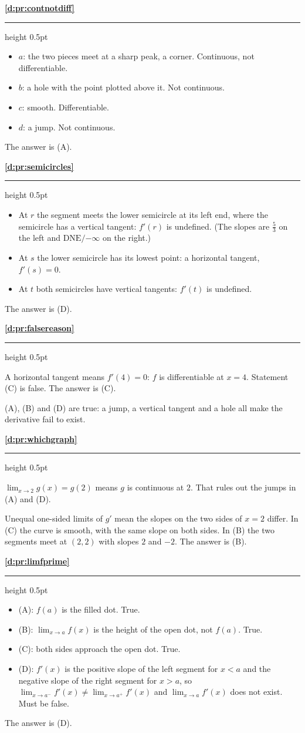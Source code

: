 \documentclass[11pt,a4paper]{article}
\newcommand{\solitem}[2]{%
 \par\addvspace{16pt}\Needspace{10\baselineskip}%
 {\large\bfseries \ref{#1}}\par\nobreak\vspace{2pt}%
 {\color{rulegray}\hrule height 0.5pt}\nobreak\vspace{7pt}%
 #2\par}
\newcommand{\DNEninf}{\ensuremath{\text{DNE}/{-\infty}}}
\begin{document}
\solitem{d:pr:contnotdiff}{%
\begin{itemize}
 \item $a$: the two pieces meet at a sharp peak, a corner. Continuous, not differentiable.
 \item $b$: a hole with the point plotted above it. Not continuous.
 \item $c$: smooth. Differentiable.
 \item $d$: a jump. Not continuous.
\end{itemize}
The answer is (A).
}

\solitem{d:pr:semicircles}{%
\begin{itemize}
 \item At $r$ the segment meets the lower semicircle at its left end, where the semicircle has a vertical tangent: $f'(r)$ is undefined. (The slopes are $\frac53$ on the left and $\DNEninf$ on the right.)
 \item At $s$ the lower semicircle has its lowest point: a horizontal tangent, $f'(s)=0$.
 \item At $t$ both semicircles have vertical tangents: $f'(t)$ is undefined.
\end{itemize}
The answer is (D).
}

\solitem{d:pr:falsereason}{%
A horizontal tangent means $f'(4)=0$: $f$ is differentiable at $x=4$. Statement (C) is false. The answer is (C).

(A), (B) and (D) are true: a jump, a vertical tangent and a hole all make the derivative fail to exist.
}

\solitem{d:pr:whichgraph}{%
$\displaystyle\lim_{x\to2}g(x)=g(2)$ means $g$ is continuous at $2$. That rules out the jumps in (A) and (D).

Unequal one-sided limits of $g'$ mean the slopes on the two sides of $x=2$ differ. In (C) the curve is smooth, with the same slope on both sides. In (B) the two segments meet at $(2,2)$ with slopes $2$ and $-2$. The answer is (B).
}

\solitem{d:pr:limfprime}{%
\begin{itemize}
 \item (A): $f(a)$ is the filled dot. True.
 \item (B): $\displaystyle\lim_{x\to a}f(x)$ is the height of the open dot, not $f(a)$. True.
 \item (C): both sides approach the open dot. True.
 \item (D): $f'(x)$ is the positive slope of the left segment for $x<a$ and the negative slope of the right segment for $x>a$, so $\displaystyle\lim_{x\to a^-}f'(x)\ne\lim_{x\to a^+}f'(x)$ and $\displaystyle\lim_{x\to a}f'(x)$ does not exist. Must be false.
\end{itemize}
The answer is (D).
}
\end{document}
